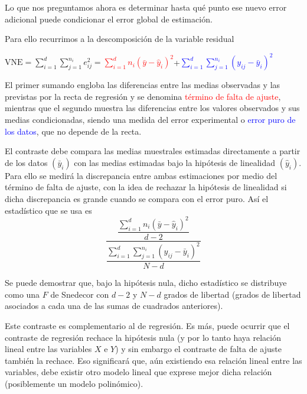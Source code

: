 \documentclass[10pt,a4paper]{book}
\begin{document}
Lo que nos preguntamos ahora es determinar hasta qué punto ese nuevo error adicional puede condicionar el error global de estimación.

Para ello recurrimos a la descomposición de la variable residual
\begin{center}
$\mathrm{VNE}=\displaystyle\sum^d_{i=1}\displaystyle\sum^{n_i}_{j=1}e^2_{ij}=$\textcolor{red}{$\displaystyle\sum^d_{i=1}n_i(\bar{y}-\widehat{y}_i)^2$}+\textcolor{blue}{$\displaystyle\sum^d_{i=1}\displaystyle\sum^{n_i}_{j=1}(y_{ij}-\bar{y}_i)^2$}
\end{center}

El primer sumando engloba las diferencias entre las medias observadas y las previstas por la recta de regresión y se denomina \textcolor{red}{término de falta de ajuste}, mientras que el segundo muestra las diferencias entre los valores observados y sus medias condicionadas, siendo una medida del error experimental o \textcolor{blue}{error puro de los datos}, que no depende de la recta.

El contraste debe compara las medias muestrales estimadas directamente a partir de los datos $(\bar{y}_i)$ con las medias estimadas bajo la hipótesis de linealidad $(\widehat{y}_i)$. Para ello se medirá la discrepancia entre ambas estimaciones por medio del término de falta de ajuste, con la idea de rechazar la hipótesis de linealidad si dicha discrepancia es grande cuando se compara con el error puro. Así el estadístico que se usa es
$$\dfrac{\dfrac{\displaystyle\sum^d_{i=1}n_i(\bar{y}-\widehat{y}_i)^2}{d-2}}{\dfrac{\displaystyle\sum^d_{i=1}\displaystyle\sum^{n_i}_{j=1}(y_{ij}-\bar{y}_i)^2}{N-d}}$$

Se puede demostrar que, bajo la hipótesis nula, dicho estadístico se distribuye como una $F$ de Snedecor con $d-2$ y $N-d$ grados de libertad (grados de libertad asociados a cada una de las sumas de cuadrados anteriores).

Este contraste es complementario al de regresión. Es más, puede ocurrir que el contraste de regresión rechace la hipótesis nula (y por lo tanto haya relación lineal entre las variables $X$ e $Y$) y sin embargo el contraste de falta de ajuste también la rechace. Eso significará que, aún existiendo esa relación lineal entre las variables, debe existir otro modelo lineal que exprese mejor dicha relación (posiblemente un modelo polinómico).
\end{document}
